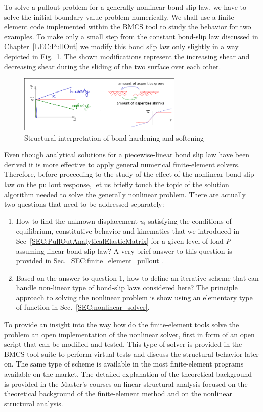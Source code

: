 \documentclass[main.tex]{subfiles}
\begin{document}
To solve a pullout problem for a generally nonlinear bond-slip law, we have to solve the initial boundary value problem numerically. We shall use a finite-element code implemented within the BMCS tool to study the behavior for two examples.
To make only a small step from the constant bond-slip law discussed in Chapter~\ref{LEC:PullOut} we modify this bond slip law only slightly in a way depicted in Fig.~\ref{FIGSourcesOfPlasticityHardening}. 
The shown modifications represent the increasing shear and decreasing shear during the sliding of the two surface over each other.
\begin{figure}[ht]
	\centering
  \includegraphics[trim={1mm 0mm 0mm 1mm},clip,width=0.7\textwidth]{drawings/plasticity_hardening_softenig.png}
	\caption{Structural interpretation of bond hardening and softening}
	\label{FIGSourcesOfPlasticityHardening}
\end{figure}

Even though analytical solutions for a piecewise-linear bond slip law have been derived it is more effective to apply general numerical finite-element solvers. 
Therefore, before proceeding to the study of the effect of the nonlinear bond-slip law on the pullout response, let us briefly touch the topic of the solution algorithm needed to solve the generally nonlinear problem. There are actually two questions that need to be addressed separately:
\begin{enumerate}
\item How to find the unknown displacement $u_\mathrm{f}$ satisfying the conditions of equilibrium, constitutive behavior and kinematics that we introduced in Sec~\ref{SEC:PullOutAnalyticalElasticMatrix} for a given level of load $P$ assuming linear bond-slip law? A very brief answer to this question is provided in Sec.~\ref{SEC:finite_element_pullout}. 
\item Based on the answer to question 1, how to define an iterative scheme that can handle non-linear type of bond-slip laws considered here? The principle approach to solving the nonlinear problem is show using an elementary type of function in Sec.~\ref{SEC:nonlinear_solver}.
\end{enumerate}
To provide an insight into the way how do the finite-element tools solve the problem an open implementation of the nonlinear solver, first in form of an open script that can be modified and tested.
This type of solver is provided in the BMCS tool suite to perform virtual tests and discuss the structural behavior later on. The same type of scheme is available in the most finite-element programs available on the market. The detailed explanation of the theoretical background is provided in the Master's courses on linear structural analysis focused on the theoretical background of the finite-element method and on the nonlinear structural analysis.
\end{document}
